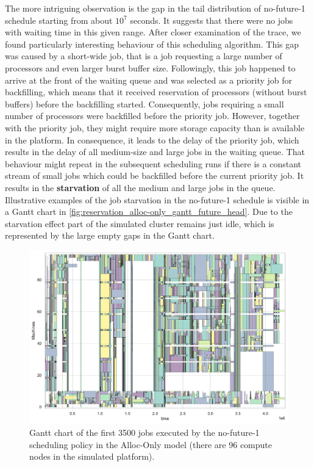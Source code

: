\documentclass[thesis-en.tex]{subfiles}
\begin{document}
The more intriguing observation is the gap in the tail distribution of no-future-1 schedule starting from about $10^7$ seconds. It suggests that there were no jobs with waiting time in this given range. After closer examination of the trace, we found particularly interesting behaviour of this scheduling algorithm. This gap was caused by a short-wide job, that is a job requesting a large number of processors and even larger burst buffer size. Followingly, this job happened to arrive at the front of the waiting queue and was selected as a priority job for backfilling, which means that it received reservation of processors (without burst buffers) before the backfilling started. Consequently, jobs requiring a small number of processors were backfilled before the priority job. However, together with the priority job, they might require more storage capacity than is available in the platform. In consequence, it leads to the delay of the priority job, which results in the delay of all medium-size and large jobs in the waiting queue. That behaviour might repeat in the subsequent scheduling runs if there is a constant stream of small jobs which could be backfilled before the current priority job. It results in the \textbf{starvation} of all the medium and large jobs in the queue. Illustrative examples of the job starvation in the no-future-1 schedule is visible in a Gantt chart in \autoref{fig:reservation_alloc-only_gantt_future_head}. Due to the starvation effect part of the simulated cluster remains just idle, which is represented by the large empty gaps in the Gantt chart.

\begin{figure}[htb]
    \centering
    \includegraphics[width=\textwidth]{reservation_alloc-only_gantt_future_head.pdf}
    \caption{Gantt chart of the first 3500 jobs executed by the no-future-1 scheduling policy in the Alloc-Only model (there are 96 compute nodes in the simulated platform).}
    \label{fig:reservation_alloc-only_gantt_future_head}
\end{figure}
\end{document}
